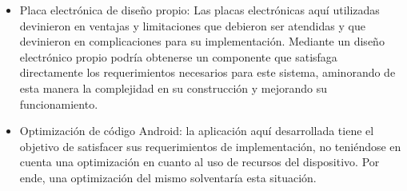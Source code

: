 \begin{itemize}
    \item Placa electrónica de diseño propio: Las placas electrónicas aquí utilizadas devinieron en ventajas y limitaciones que debieron ser atendidas y que devinieron en complicaciones para su implementación. Mediante un diseño electrónico propio podría obtenerse un componente que satisfaga directamente los requerimientos necesarios para este sistema, aminorando de esta manera la complejidad en su construcción y mejorando su funcionamiento.
    
    \item Optimización de código Android: la aplicación aquí desarrollada tiene el objetivo de satisfacer sus requerimientos de implementación, no teniéndose en cuenta una optimización en cuanto al uso de recursos del dispositivo. Por ende, una optimización del mismo solventaría esta situación.
    
    
\end{itemize}






